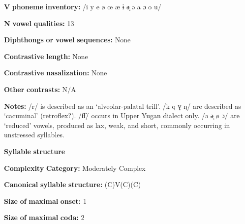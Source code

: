 \begin{styleBody}
\textbf{V} \textbf{phoneme} \textbf{inventory:} /i y e ø œ æ ɨ ə̘ ə a ɔ o u/
\end{styleBody}

\begin{styleBody}
\textbf{N} \textbf{vowel} \textbf{qualities:} 13
\end{styleBody}

\begin{styleBody}
\textbf{Diphthongs} \textbf{or} \textbf{vowel} \textbf{sequences:} None
\end{styleBody}

\begin{styleBody}
\textbf{Contrastive} \textbf{length:} None
\end{styleBody}

\begin{styleBody}
\textbf{Contrastive} \textbf{nasalization:} None
\end{styleBody}

\begin{styleBody}
\textbf{Other} \textbf{contrasts:} N/A
\end{styleBody}

\begin{styleBody}
\textbf{Notes:} /r/ is described as an ‘alveolar-palatal trill’. /k q ɣ ŋ/ are described as ‘cacuminal’ (retroflex?). /t͡ɬ/ occurs in Upper Yugan dialect only. /ə ə̘ ø ɔ/ are ‘reduced’ vowels, produced as lax, weak, and short, commonly occurring in unstressed syllables.
\end{styleBody}

\begin{styleBody}
\textbf{Syllable} \textbf{structure}
\end{styleBody}

\begin{styleBody}
\textbf{Complexity} \textbf{Category:} Moderately Complex
\end{styleBody}

\begin{styleBody}
\textbf{Canonical} \textbf{syllable} \textbf{structure:} (C)V(C)(C) \citep[53-7]{Filchenko2007}
\end{styleBody}

\begin{styleBody}
\textbf{Size} \textbf{of} \textbf{maximal} \textbf{onset:} 1
\end{styleBody}

\begin{styleBody}
\textbf{Size} \textbf{of} \textbf{maximal} \textbf{coda:} 2
\end{styleBody}

